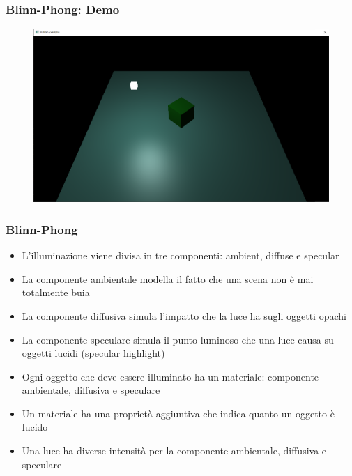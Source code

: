 \begin{frame}
\frametitle{Blinn-Phong: Demo}
\begin{figure}[ht]
    \centering
    \includegraphics[scale=0.25]{images/SlidesBlinnPhong/SceneMaterialsLight.png}
\end{figure}
\end{frame}

\begin{frame}
\frametitle{Blinn-Phong}
\begin{itemize}
\item L'illuminazione viene divisa in tre componenti: ambient, diffuse e specular
\item La componente ambientale modella il fatto che una scena non è mai totalmente buia
\item La componente diffusiva simula l'impatto che la luce ha sugli oggetti opachi
\item La componente speculare simula il punto luminoso che una luce causa su oggetti lucidi (specular highlight)
\item Ogni oggetto che deve essere illuminato ha un materiale: componente ambientale, diffusiva e speculare
\item Un materiale ha una proprietà aggiuntiva che indica quanto un oggetto è lucido
\item Una luce ha diverse intensità per la componente ambientale, diffusiva e speculare
\end{itemize}
\end{frame}
